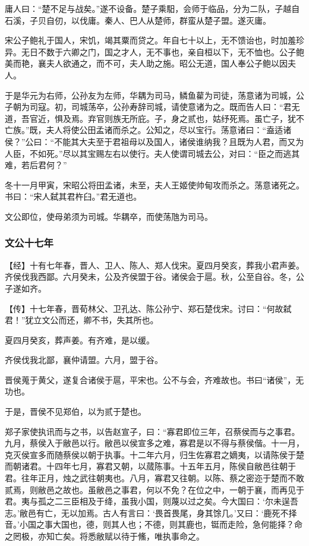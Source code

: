 \documentclass[]{article}
\begin{document}
庸人曰：``楚不足与战矣。''遂不设备。楚子乘馹，会师于临品，分为二队，子越自石溪，子贝自仞，以伐庸。秦人、巴人从楚师，群蛮从楚子盟。遂灭庸。

宋公子鲍礼于国人，宋饥，竭其粟而贷之。年自七十以上，无不馈诒也，时加羞珍异。无日不数于六卿之门，国之才人，无不事也，亲自桓以下，无不恤也。公子鲍美而艳，襄夫人欲通之，而不可，夫人助之施。昭公无道，国人奉公子鲍以因夫人。

于是华元为右师，公孙友为左师，华耦为司马，鳞鱼雚为司徒，荡意诸为司城，公子朝为司寇。初，司城荡卒，公孙寿辞司城，请使意诸为之。既而告人曰：``君无道，吾官近，惧及焉。弃官则族无所庇。子，身之贰也，姑纾死焉。虽亡子，犹不亡族。''既，夫人将使公田孟诸而杀之。公知之，尽以宝行。荡意诸曰：``盍适诸侯？''公曰：``不能其大夫至于君祖母以及国人，诸侯谁纳我？且既为人君，而又为人臣，不如死。''尽以其宝赐左右以使行。夫人使谓司城去公，对曰：``臣之而逃其难，若后君何？''

冬十一月甲寅，宋昭公将田孟诸，未至，夫人王姬使帅甸攻而杀之。荡意诸死之。书曰：``宋人弑其君杵臼。''君无道也。

文公即位，使母弟须为司城。华耦卒，而使荡虺为司马。

\hypertarget{header-n1260}{%
\subsubsection{文公十七年}\label{header-n1260}}

【经】十有七年春，晋人、卫人、陈人、郑人伐宋。夏四月癸亥，葬我小君声姜。齐侯伐我西鄙。六月癸未，公及齐侯盟于谷。诸侯会于扈。秋，公至自谷。冬，公子遂如齐。

【传】十七年春，晋荀林父、卫孔达、陈公孙宁、郑石楚伐宋。讨曰：``何故弑君！''犹立文公而还，卿不书，失其所也。

夏四月癸亥，葬声姜。有齐难，是以缓。

齐侯伐我北鄙，襄仲请盟。六月，盟于谷。

晋侯蒐于黄父，遂复合诸侯于扈，平宋也。公不与会，齐难故也。书曰``诸侯''，无功也。

于是，晋侯不见郑伯，以为贰于楚也。

郑子家使执讯而与之书，以告赵宣子，曰：``寡君即位三年，召蔡侯而与之事君。九月，蔡侯入于敝邑以行。敝邑以侯宣多之难，寡君是以不得与蔡侯偕。十一月，克灭侯宣多而随蔡侯以朝于执事。十二年六月，归生佐寡君之嫡夷，以请陈侯于楚而朝诸君。十四年七月，寡君又朝，以蒇陈事。十五年五月，陈侯自敝邑往朝于君。往年正月，烛之武往朝夷也。八月，寡君又往朝。以陈、蔡之密迩于楚而不敢贰焉，则敝邑之故也。虽敝邑之事君，何以不免？在位之中，一朝于襄，而再见于君。夷与孤之二三臣相及于绛，虽我小国，则蔑以过之矣。今大国曰：`尔未逞吾志。'敝邑有亡，无以加焉。古人有言曰：`畏首畏尾，身其馀几。'又曰：`鹿死不择音。'小国之事大国也，德，则其人也；不德，则其鹿也，铤而走险，急何能择？命之罔极，亦知亡矣。将悉敝赋以待于鯈，唯执事命之。
\end{document}
